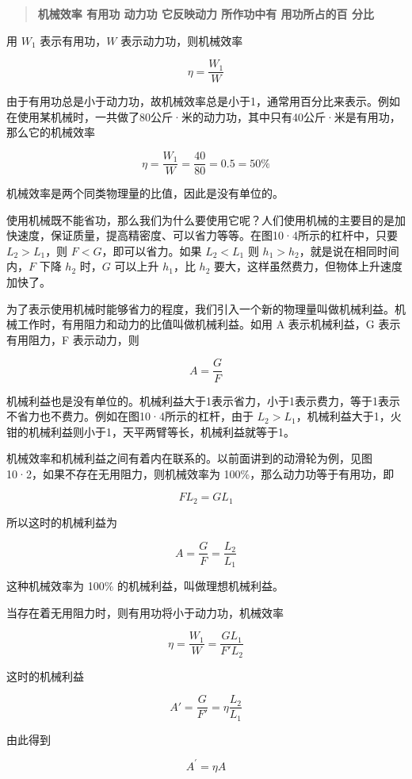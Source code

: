 \begin{quote}
\textbf{机械效率 有用功 动力功 它反映动力 所作功中有 用功所占的百 分比}
\end{quote}

用 \(W_{1}\) 表示有用功，\(W\) 表示动力功，则机械效率

\[
\eta=\frac{W_{1}}{W}\tag{10.3}
\]

由于有用功总是小于动力功，故机械效率总是小于1，通常用百分比来表示。例如在使用某机械时，一共做了80公斤·米的动力功，其中只有40公斤·米是有用功，那么它的机械效率

\[
\eta = \frac {W _ {1}}{W} = \frac {40}{80} = 0.5 = 50\%
\]

机械效率是两个同类物理量的比值，因此是没有单位的。

使用机械既不能省功，那么我们为什么要使用它呢？人们使用机械的主要目的是加快速度，保证质量，提高精密度、可以省力等等。在图10·4所示的杠杆中，只要
\(L_{2}>L_{1}\)，则 \(F < G\)，即可以省力。如果 \(L_{2} < L_{1}\) 则
\(h_{1} > h_{2}\)，就是说在相同时间内，\(F\) 下降 \(h_{2}\) 时，\(G\)
可以上升 \(h_{1}\)，比 \(h_{2}\)
要大，这样虽然费力，但物体上升速度加快了。

为了表示使用机械时能够省力的程度，我们引入一个新的物理量叫做机械利益。机械工作时，有用阻力和动力的比值叫做机械利益。如用
A 表示机械利益，G 表示有用阻力，F 表示动力，则

\[
A = \frac {G}{F} \tag {10.4}
\]

机械利益也是没有单位的。机械利益大于1表示省力，小于1表示费力，等于1表示不省力也不费力。例如在图10·4所示的杠杆，由于
\(L_{2}>L_{1}\)，机械利益大于1，火钳的机械利益则小于1，天平两臂等长，机械利益就等于1。

机械效率和机械利益之间有着内在联系的。以前面讲到的动滑轮为例，见图10·2，如果不存在无用阻力，则机械效率为
100\%，那么动力功等于有用功，即

\[
FL_{2}=GL_{1}
\]

所以这时的机械利益为

\[
A = \frac {G}{F} = \frac {L _ {2}}{L _ {1}}
\]

这种机械效率为 100\% 的机械利益，叫做理想机械利益。

当存在着无用阻力时，则有用功将小于动力功，机械效率

\[
\eta=\frac{W_{1}}{W}=\frac{GL_{1}}{F'L_{2}}
\]

这时的机械利益

\[
A'=\frac{G}{F'}=\eta\frac{L_{2}}{L_{1}}
\]

由此得到

\[
A ^ {\prime} = \eta A \tag {10.5}
\]


